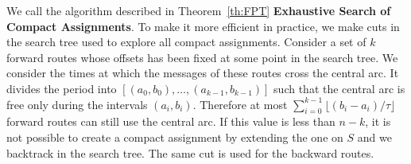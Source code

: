\documentclass[10pt, conference, letterpaper]{IEEEtran}
\newcommand\pazl{\textsc{pazl}\xspace}
\begin{document}
We call the algorithm described in Theorem~\ref{th:FPT} \textbf{Exhaustive Search of Compact Assignments}. To make it more efficient in practice, we make cuts in the search tree used to explore all compact assignments. Consider a set of $k$ forward routes whose offsets has been fixed at some point in the search tree. We consider the times at which the messages of these routes cross the central arc. It divides the period into $[(a_0,b_0), \dots, (a_{k-1},b_{k-1})]$ such that the central arc is free only during the intervals $(a_i,b_i)$. Therefore at most $\displaystyle{ \sum_{i=0}^{k-1} \lfloor(b_{i} -a_i)/\tau\rfloor} $ forward routes can still use the central arc. If this value is less than $n - k$, it is not possible to create a compact assignment by extending the one on $S$ and we backtrack in the search tree. The same cut is used for the backward routes.
% 
%       
\end{document}
